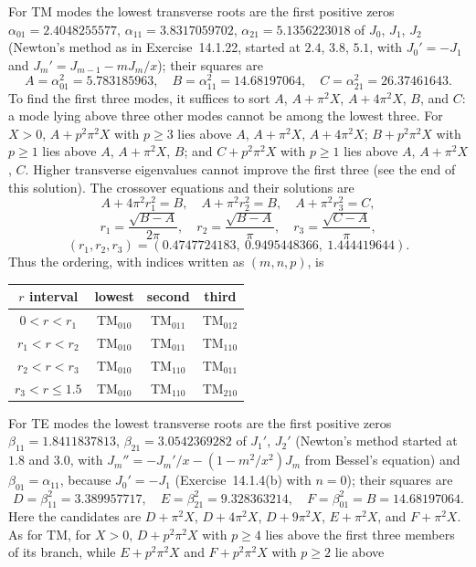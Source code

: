 For TM modes the lowest transverse roots are the first positive zeros
$\alpha_{01}=2.4048255577$, $\alpha_{11}=3.8317059702$,
$\alpha_{21}=5.1356223018$ of $J_0$, $J_1$, $J_2$ (Newton's method as
in Exercise~14.1.22, started at $2.4$, $3.8$, $5.1$, with $J_0'=-J_1$
and $J_m'=J_{m-1}-mJ_m/x$); their squares are
\[
A=\alpha_{01}^2=5.783185963,\quad
B=\alpha_{11}^2=14.68197064,\quad
C=\alpha_{21}^2=26.37461643.
\]
To find the first three modes, it suffices to sort
$A$, $A+\pi^2X$, $A+4\pi^2X$, $B$, and $C$: a mode lying above three
other modes cannot be among the lowest three. For $X>0$,
$A+p^2\pi^2X$ with $p\ge3$ lies above $A$, $A+\pi^2X$, $A+4\pi^2X$;
$B+p^2\pi^2X$ with $p\ge1$ lies above $A$, $A+\pi^2X$, $B$; and
$C+p^2\pi^2X$ with $p\ge1$ lies above $A$, $A+\pi^2X$, $C$. Higher
transverse eigenvalues cannot improve the first three (see the end of
this solution). The crossover equations and their solutions are
\[
A+4\pi^2r_1^2=B,\quad A+\pi^2r_2^2=B,\quad
A+\pi^2r_3^2=C,
\]
\[
r_1=\frac{\sqrt{B-A}}{2\pi},\quad r_2=\frac{\sqrt{B-A}}{\pi},\quad
r_3=\frac{\sqrt{C-A}}{\pi},
\]
\[
(r_1,r_2,r_3)=(0.4747724183,\ 0.9495448366,\ 1.444419644).
\]
Thus the ordering, with indices written as $(m,n,p)$, is
\begin{center}
\begin{tabular}{c c c c}
\toprule $r$ interval & lowest & second & third\\\midrule
$0<r<r_1$ & TM$_{010}$ & TM$_{011}$ & TM$_{012}$\\
$r_1<r<r_2$ & TM$_{010}$ & TM$_{011}$ & TM$_{110}$\\
$r_2<r<r_3$ & TM$_{010}$ & TM$_{110}$ & TM$_{011}$\\
$r_3<r\le1.5$ & TM$_{010}$ & TM$_{110}$ & TM$_{210}$\\
\bottomrule
\end{tabular}
\end{center}
For TE modes the lowest transverse roots are the first positive zeros
$\beta_{11}=1.8411837813$, $\beta_{21}=3.0542369282$ of $J_1'$, $J_2'$
(Newton's method started at $1.8$ and $3.0$, with
$J_m''=-J_m'/x-(1-m^2/x^2)J_m$ from Bessel's equation) and
$\beta_{01}=\alpha_{11}$, because $J_0'=-J_1$ (Exercise~14.1.4(b) with
$n=0$); their squares are
\[
D=\beta_{11}^2=3.389957717,\quad
E=\beta_{21}^2=9.328363214,\quad
F=\beta_{01}^2=B=14.68197064.
\]
Here the candidates are $D+\pi^2X$, $D+4\pi^2X$,
$D+9\pi^2X$, $E+\pi^2X$, and $F+\pi^2X$. As for TM, for $X>0$,
$D+p^2\pi^2X$ with $p\ge4$ lies above the first three members of its
branch, while $E+p^2\pi^2X$ and $F+p^2\pi^2X$ with $p\ge2$ lie above
